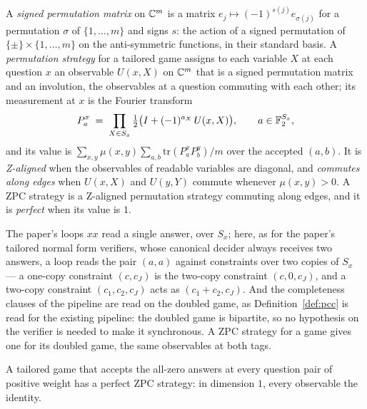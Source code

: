 \begin{definition}
\label{def:zpc-strategy}
\leanok
A \emph{signed permutation matrix} on $\mathbb{C}^m$ is a matrix $e_j \mapsto (-1)^{s(j)} e_{\sigma(j)}$
for a permutation $\sigma$ of $\{1, \dots, m\}$ and signs $s$: the action of a signed
permutation of $\{\pm\} \times \{1, \dots, m\}$ on the anti-symmetric functions, in their
standard basis. A \emph{permutation strategy} for a tailored game assigns to each variable $X$
at each question $x$ an observable $U(x, X)$ on $\mathbb{C}^m$ that is a signed permutation matrix and
an involution, the observables at a question commuting with each other; its measurement at $x$
is the Fourier transform
\[
  P^x_a \;=\; \prod_{X \in S_x} \tfrac12\bigl(I + (-1)^{a_X}\, U(x, X)\bigr),
  \qquad a \in \mathbb{F}_2^{S_x},
\]
and its value is $\sum_{x, y} \mu(x, y) \sum_{a, b} \mathrm{tr}(P^x_a P^y_b)/m$ over the
accepted $(a, b)$. It is \emph{Z-aligned} when the observables of readable variables are
diagonal, and \emph{commutes along edges} when $U(x, X)$ and $U(y, Y)$ commute whenever
$\mu(x, y) > 0$. A ZPC strategy is a Z-aligned permutation strategy commuting along edges, and
it is \emph{perfect} when its value is $1$.
\end{definition}

\begin{remark}
\label{rem:tailored-conventions}
The paper's loops $xx$ read a single answer, over $S_x$; here, as for the paper's tailored
normal form verifiers, whose canonical decider always receives two answers, a loop reads the
pair $(a, a)$ against constraints over two copies of $S_x$ --- a one-copy constraint $(c, c_J)$
is the two-copy constraint $(c, 0, c_J)$, and a two-copy constraint $(c_1, c_2, c_J)$ acts as
$(c_1 + c_2, c_J)$. And the completeness clauses of the pipeline are read on the doubled game,
as Definition~\ref{def:pcc} is read for the existing pipeline: the doubled game is bipartite,
so no hypothesis on the verifier is needed to make it synchronous. A ZPC strategy for a game
gives one for its doubled game, the same observables at both tags.
\end{remark}

\begin{lemma}
\label{lem:tailored-trivial-zpc}
\leanok
A tailored game that accepts the all-zero answers at every question pair of positive weight
has a perfect ZPC strategy: in dimension $1$, every observable the identity.
\end{lemma}

